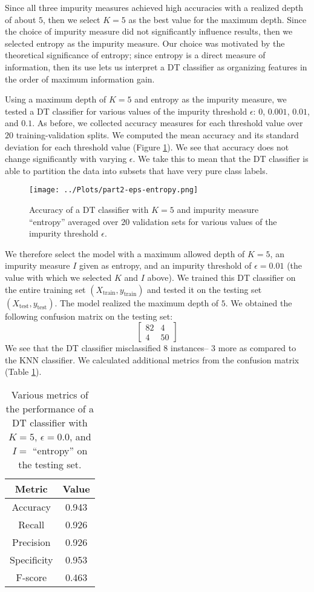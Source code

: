 \documentclass[12pt]{article}
\newcommand{\eps}{\epsilon}
\newcommand{\Xtrain}{X_{\mbox{train}}}
\newcommand{\ytrain}{y_{\mbox{train}}}
\newcommand{\Xtest}{X_{\mbox{test}}}
\newcommand{\ytest}{y_{\mbox{test}}}
\begin{document}
Since all three impurity measures achieved high accuracies with a realized depth of about $5$, then we select $K=5$ as the best value for the maximum depth. Since the choice of impurity measure did not significantly influence results, then we selected entropy as the impurity measure. Our choice was motivated by the theoretical significance of entropy; since entropy is a direct measure of information, then its use lets us interpret a DT classifier as organizing features in the order of maximum information gain.

Using a maximum depth of $K=5$ and  entropy as the impurity measure, we tested a DT classifier for various values of the impurity threshold $\eps$: $0$, $0.001$, $0.01$, and $0.1$. As before, we collected accuracy measures for each threshold value over $20$ training-validation splits. We computed the mean accuracy and its standard deviation for each threshold value (Figure \ref{part2-eps-entropy}). We see that accuracy does not change significantly with varying $\eps$. We take this to mean that the DT classifier is able to partition the data into subsets that have very pure class labels.

\begin{figure}
\centering
\texttt{[image: ../Plots/part2-eps-entropy.png]}
\caption{\label{part2-eps-entropy} Accuracy of a DT classifier with $K=5$ and impurity measure ``entropy'' averaged over $20$ validation sets for various values of the impurity threshold $\eps$.}
\end{figure}

We therefore select the model with a maximum allowed depth of $K=5$, an impurity measure $I$ given as entropy, and an impurity threshold of $\eps=0.01$ (the value with which we selected $K$ and $I$ above). We trained this DT classifier on the entire training set $(\Xtrain, \ytrain)$ and tested it on the testing set $(\Xtest, \ytest)$. The model realized the maximum depth of $5$. We obtained the following confusion matrix on the testing set:
\[ \begin{bmatrix}
82 & 4 \\
4 & 50
\end{bmatrix} \]
We see that the DT classifier misclassified $8$ instances-- $3$ more as compared to the KNN classifier. We calculated additional metrics from the confusion matrix (Table \ref{part2-table}).

\begin{table}
\centering
\begin{tabular}{|c|c|} \hline
Metric & Value \\ \hline
Accuracy & 0.943 \\
Recall & 0.926 \\
Precision & 0.926 \\
Specificity & 0.953 \\
F-score & 0.463 \\ \hline
\end{tabular}
\caption{\label{part2-table} Various metrics of the performance of a DT classifier with $K=5$, $\eps=0.0$, and $I=$ ``entropy'' on the testing set.}
\end{table}
\end{document}
